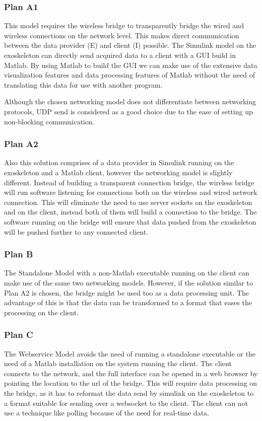 \subsubsection{Plan A1}
This model requires the wireless bridge to transparently bridge the wired and wireless connections on the network level. This makes direct communication between the data provider (E) and client (I) possible. The Simulink model on the exoskeleton can directly send acquired data to a client with a GUI build in Matlab. By using Matlab to build the GUI we can make use of the extensive data visualization features and data processing features of Matlab without the need of translating this data for use with another program. 

Although the chosen networking model does not differentiate between networking protocols, UDP send \cite{web:UDPSend} is considered as a good choice due to the ease of setting up non-blocking communication.
\subsubsection{Plan A2}
Also this solution comprises of a data provider in Simulink running on the exoskeleton and a Matlab client, however the networking model is slightly different. Instead of building a transparent connection bridge, the wireless bridge will run software listening for connections both on the wireless and wired network connection. This will eliminate the need to use server sockets on the exoskeleton and on the client, instead both of them will build a connection to the bridge. The software running on the bridge will ensure that data pushed from the exoskeleton will be pushed further to any connected client.
\subsubsection{Plan B}
The Standalone Model with a non-Matlab executable running on the client can make use of the same two networking models. However, if the solution similar to Plan A2 is chosen, the bridge might be used too as a data processing unit. The advantage of this is that the data can be transformed to a format that eases the processing on the client.
\subsubsection{Plan C}
The Webservice Model avoids the need of running a standalone executable or the need of a Matlab installation on the system running the client. The client connects to the network, and the full interface can be opened in a web browser by pointing the location to the url of the bridge. This will require data processing on the bridge, as it has to reformat the data send by simulink on the exoskeleton to a format suitable for sending over a websocket to the client. The client can not use a technique like polling because of the need for real-time data.